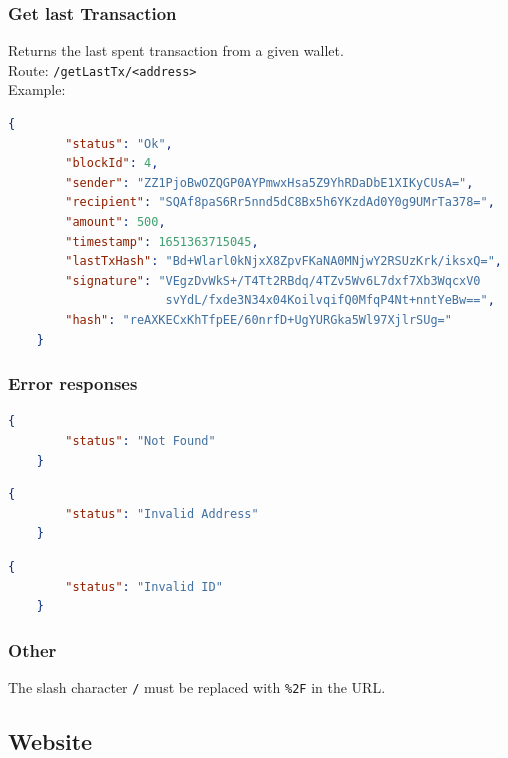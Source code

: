 \documentclass[../documentation.tex]{subfiles}
\begin{document}
\subsubsection{Get last Transaction}

Returns the last spent transaction from a given wallet.
\\
Route: \texttt{/getLastTx/<address>}
\\
Example:
\begin{lstlisting}[language=json]
    {
        "status": "Ok",
        "blockId": 4,
        "sender": "ZZ1PjoBwOZQGP0AYPmwxHsa5Z9YhRDaDbE1XIKyCUsA=",
        "recipient": "SQAf8paS6Rr5nnd5dC8Bx5h6YKzdAd0Y0g9UMrTa378=",
        "amount": 500,
        "timestamp": 1651363715045,
        "lastTxHash": "Bd+Wlarl0kNjxX8ZpvFKaNA0MNjwY2RSUzKrk/iksxQ=",
        "signature": "VEgzDvWkS+/T4Tt2RBdq/4TZv5Wv6L7dxf7Xb3WqcxV0
                      svYdL/fxde3N34x04KoilvqifQ0MfqP4Nt+nntYeBw==",
        "hash": "reAXKECxKhTfpEE/60nrfD+UgYURGka5Wl97XjlrSUg="
    }
\end{lstlisting}

\subsubsection{Error responses}

\begin{lstlisting}[language=json]
    {
        "status": "Not Found"
    }
\end{lstlisting}

\begin{lstlisting}[language=json]
    {
        "status": "Invalid Address"
    }
\end{lstlisting}

\begin{lstlisting}[language=json]
    {
        "status": "Invalid ID"
    }
\end{lstlisting}

\subsubsection{Other}

The slash character \texttt{/} must be replaced with \texttt{\%2F} in the URL.

\pagebreak

\subsection{Website}
\end{document}
